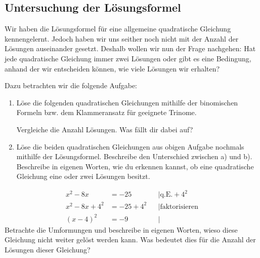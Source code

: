 \documentclass[11pt,oneside]{article}
\begin{document}
\subsection{Untersuchung der Lösungsformel}
	Wir haben die Lösungsformel für eine allgemeine quadratische Gleichung kennengelernt. Jedoch haben wir uns seither noch nicht mit der Anzahl der Lösungen auseinander gesetzt. Deshalb wollen wir nun der Frage nachgehen: \glqq Hat jede quadratische Gleichung immer zwei Lösungen oder gibt es eine Bedingung, anhand der wir entscheiden können, wie viele Lösungen wir erhalten?\grqq

	Dazu betrachten wir die folgende Aufgabe:
	\begin{aufgabe}
		\begin{enumerate}
			\item Löse die folgenden quadratischen Gleichungen mithilfe der binomischen Formeln bzw. dem Klammeransatz für geeignete Trinome.
			\begin{enumerate}[label=\alph*)]\end{enumerate}
			Vergleiche die Anzahl Lösungen. Was fällt dir dabei auf?\vspace{5pt}\newline{}
			\item Löse die beiden quadratischen Gleichungen aus obigen Aufgabe nochmals mithilfe der Lösungsformel. Beschreibe den Unterschied zwischen a) und b).\vspace{22pt}\newline
			Beschreibe in eigenen Worten, wie du erkennen kannst, ob eine quadratische Gleichung eine oder zwei Lösungen besitzt.\vspace{5pt}\newline{}
		\end{enumerate}
	\end{aufgabe}
	\begin{aufgabe}
		\begin{align*}
			x^2-8x&=-25&&\mid\text{q.E.} +4^2\\
			x^2-8x+4^2&=-25+4^2&&\mid\text{faktorisieren}\\
			(x-4)^2&=-9&&\mid
		\end{align*}
		Betrachte die Umformungen und beschreibe in eigenen Worten, wieso diese Gleichung nicht weiter gelöst werden kann.\vspace{11pt}\newline
		Was bedeutet dies für die Anzahl der Lösungen dieser Gleichung?\vspace{5pt}\newline\karos{2.5}
	\end{aufgabe}
\end{document}
